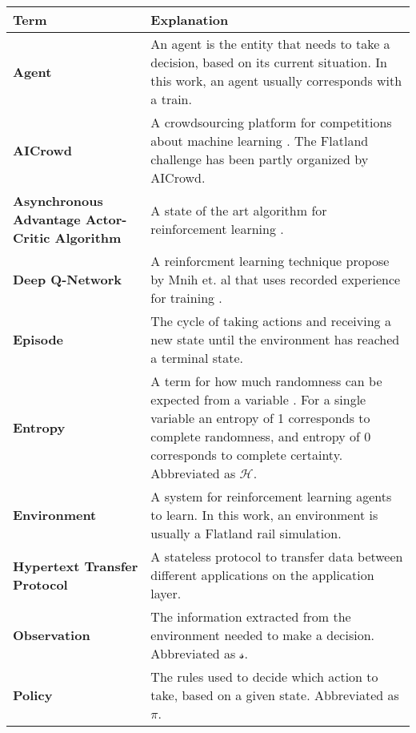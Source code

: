 \begin{longtable}{|m{3.5cm}|m{10.5cm}|}\hline
\rowcolor{gray} \textbf{Term}&
Explanation \\ 
\hline

\textbf{Agent}&
An agent is the entity that needs to take a decision, based on its current situation. In this work, an agent usually corresponds with a train.\\
\hline

\textbf{AICrowd}&
A crowdsourcing platform for competitions about machine learning \cite{aicrowd_startpage}. The Flatland challenge has been partly organized by AICrowd.\\ 
\hline

\textbf{Asynchronous Advantage Actor-Critic Algorithm}&
A state of the art algorithm for reinforcement learning \cite{a3c}. \\
\hline

\textbf{Deep Q-Network}&
A reinforcment learning technique propose by Mnih et. al that uses recorded experience for training \cite{mnih2013playing}. \\
\hline


\textbf{Episode}&
The cycle of taking actions and receiving a new state until the environment has reached a terminal state. \\ 
\hline

\textbf{Entropy}&
A term for how much randomness can be expected from a variable \cite{entropy_shannon}.
For a single variable an entropy of 1 corresponds to complete randomness, and entropy of 0 corresponds to complete certainty.
Abbreviated as $\mathcal{H}$.\\ 
\hline

\textbf{Environment}&
A system for reinforcement learning agents to learn. In this work, an environment is usually a Flatland rail simulation.\\
\hline

\textbf{Hypertext Transfer Protocol}&
A stateless protocol to transfer data between different applications on the application layer. \\ \hline

\textbf{Observation}&
The information extracted from the environment needed to make a decision. Abbreviated as $\mathcal{s}$.\\ 
\hline

\textbf{Policy}&
The rules used to decide which action to take, based on a given state. Abbreviated as $\pi$.\\ 
\hline


\end{longtable}
